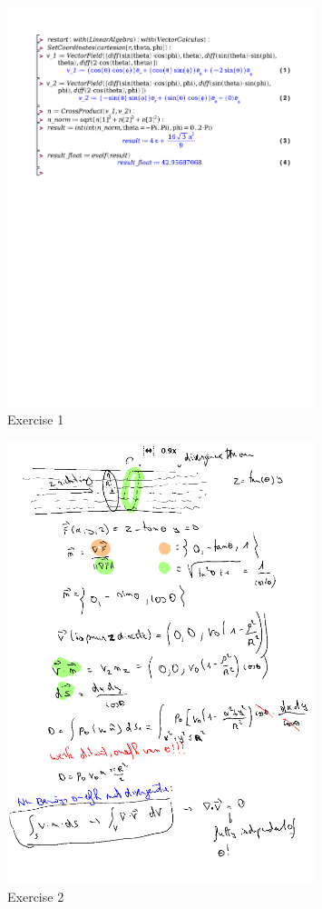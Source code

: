 \documentclass[a4paper]{report}
\begin{document}
\begin{figure}[H]
	\centering
	\includegraphics[width=0.8\textwidth]{exercises/huis_7_ex_1.pdf}
	\caption{Exercise 1}
	\label{fig:huis_7_ex_1}
\end{figure}

\begin{figure}[H]
	\centering
	\includegraphics[width=0.8\textwidth]{assets/huis_7_ex_2.png}
	\caption{Exercise 2}
	\label{fig:huis_7_ex_2}
\end{figure}
\end{document}
